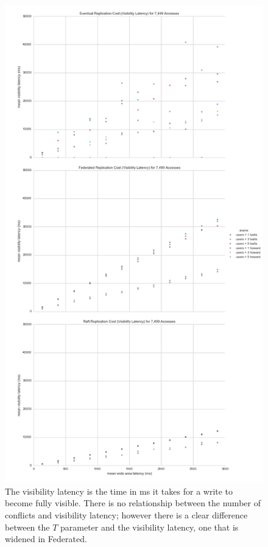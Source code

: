 \documentclass[10pt,letterpaper]{article}
\begin{document}
\begin{figure}[!h]
    \centering
        \includegraphics[height=0.9\textheight]{figures/visibility_latency.png}
        \caption{\textsf{The visibility latency is the time in ms it takes for a write to become fully visible. There is no relationship between the number of conflicts and visibility latency; however there is a clear difference between the $T$ parameter and the visibility latency, one that is widened in Federated.}}
        \label{fig:visibility_latency}
\end{figure}
\end{document}

